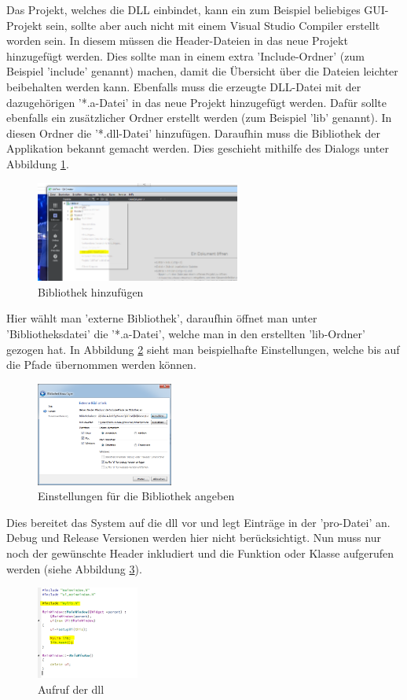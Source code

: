 Das Projekt, welches die DLL einbindet, kann ein zum Beispiel beliebiges GUI-Projekt sein, sollte aber auch nicht mit einem Visual Studio Compiler erstellt worden sein. In diesem müssen die Header-Dateien in das neue Projekt hinzugefügt werden. Dies sollte man in einem extra 'Include-Ordner' (zum Beispiel 'include' genannt) machen, damit die Übersicht über die Dateien leichter beibehalten werden kann. Ebenfalls muss die erzeugte DLL-Datei mit der dazugehörigen '*.a-Datei' in das neue Projekt hinzugefügt werden. Dafür sollte ebenfalls ein zusätzlicher Ordner erstellt werden (zum Beispiel 'lib' genannt). In diesen Ordner die '*.dll-Datei' hinzufügen. Daraufhin muss die Bibliothek der Applikation bekannt gemacht werden. Dies geschieht mithilfe des Dialogs unter Abbildung \ref{fig:Pro}.
\begin{figure}[H]
	\centering
	\includegraphics[width=0.60\textwidth]{figures/qtPro.png}
	\caption{Bibliothek hinzufügen}
	\label{fig:Pro}
\end{figure}
Hier wählt man 'externe Bibliothek', daraufhin öffnet man unter 'Bibliotheksdatei' die '*.a-Datei', welche man in den erstellten 'lib-Ordner' gezogen hat. In Abbildung \ref{fig:bibdatei} sieht man beispielhafte Einstellungen, welche bis auf die Pfade übernommen werden können. 
\begin{figure}[H]
	\centering
	\includegraphics[width=0.40\textwidth]{figures/qtBibdatei.png}
	\caption{Einstellungen für die Bibliothek angeben}
	\label{fig:bibdatei}
\end{figure}
Dies bereitet das System auf die dll vor und legt Einträge in der 'pro-Datei' an. Debug und Release Versionen werden hier nicht berücksichtigt. \newline
Nun muss nur noch der gewünschte Header inkludiert und die Funktion oder Klasse aufgerufen werden (siehe Abbildung \ref{fig:Final}).
\begin{figure}[H]
	\centering
	\includegraphics[width=0.30\textwidth]{figures/qtFinal.png}
	\caption{Aufruf der dll}
	\label{fig:Final}
\end{figure}

